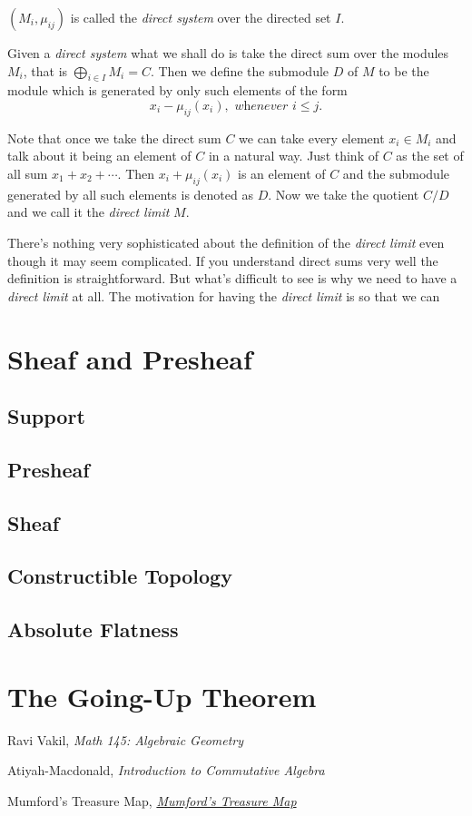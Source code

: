 \documentclass[]{report}
\begin{document}
$(M_i,\mu_{ij})$ is called the \textit{direct system} over the directed set $I$.

Given a \textit{direct system} what we shall do is take the direct sum over the modules $M_i$, that is $\bigoplus_{i\in I} M_i = C$. Then we define the submodule $D$ of $M$ to be the module which is generated by only such elements of the form
$$x_i - \mu_{ij}(x_i), \textit{ whenever } i\leq j.$$

Note that once we take the direct sum $C$ we can take every element $x_i\in M_i$ and talk about it being an element of $C$ in a natural way. Just think of $C$ as the set of all sum $x_1  + x_2 + \cdots$. Then $x_i + \mu_{ij}(x_i)$ is an element of $C$ and the submodule generated by all such elements is denoted as $D$. Now we take the quotient $C/D$ and we call it the \textit{direct limit} $M$.

There's nothing very sophisticated about the definition of the \textit{direct limit} even though it may seem complicated. If you understand direct sums very well the definition is straightforward. But what's difficult to see is why we need to have a \textit{direct limit} at all. The motivation for having the \textit{direct limit} is so that we can 


\chapter{Sheaf and Presheaf}
\section{Support}
\section{Presheaf}
\section{Sheaf}
\section{Constructible Topology}
\section{Absolute Flatness}

\chapter{The Going-Up Theorem}

\begin{thebibliography}{9}

    Ravi Vakil,
    \textit{Math 145: Algebraic Geometry}

    Atiyah-Macdonald, 
    \textit{Introduction to Commutative Algebra}

    Mumford's Treasure Map,
    \href{https://web.archive.org/web/20201130150255/http://www.neverendingbooks.org/mumfords-treasure-map}{\textit{Mumford's Treasure Map}}
\end{thebibliography}
\end{document}
